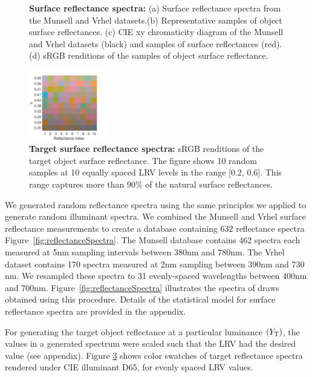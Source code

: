\documentclass{jov}
\begin{document}
\begin{figure}
\begin{subfigure}{0.24 \textwidth}
        \label{fig:backgroundSwatches}
    \end{subfigure}
    \caption{{\bf Surface reflectance spectra:} (a) Surface reflectance spectra from the Munsell and Vrhel datasets.(b) Representative samples of object surface reflectances. (c) CIE xy chromaticity diagram of the Munsell and Vrhel datasets (black) and samples of surface reflectances (red). (d) sRGB renditions of the samples of object surface reflectance.}
\label{fig:surfaceReflectanceGeneration}
\end{figure}

\begin{figure}
\centering
\includegraphics[width=0.3\textwidth]{../Figures/Figure7/Figure8.pdf}
\caption{{\bf Target surface reflectance spectra:} sRGB renditions of the target object surface reflectance. The figure shows 10 random samples at 10 equally spaced LRV levels in the range [0.2, 0.6]. This range captures more than 90\% of the natural surface reflectances.}
\label{fig:targetSwatches}
\end{figure}


We generated random reflectance spectra using the same principles we applied to generate random illuminant spectra.
We combined the Munsell \cite{kelly1943tristimulus} and Vrhel \cite{vrhel1994measurement} surface reflectance 
measurements to create a database containing 632 reflectance spectra Figure~\ref{fig:reflectanceSpectra}.
The Munsell database contains 462 spectra each measured at 5nm sampling intervals between 380nm and 780nm.
The Vrhel dataset contains 170 spectra measured at 2nm sampling between 390nm and 730 nm.
We resampled these spectra to 31 evenly-spaced wavelengths between $400$nm and $700$nm.
Figure~\ref{fig:reflectanceSpectra} illustrates the spectra of draws obtained using this procedure.
Details of the statistical model for surface reflectance spectra are provided in the appendix. 

For generating the target object reflectance at a particular luminance $(Y_{\rm T})$, the values in a generated spectrum were 
scaled such that the LRV had the desired value (see appendix).
Figure \ref{fig:targetSwatches} shows color swatches of target reflectance spectra rendered under CIE illuminant D65, for evenly spaced LRV values.
\end{document}
